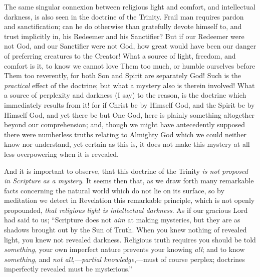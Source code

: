 The same singular connexion between religious light
and comfort, and intellectual darkness, is also seen in
the doctrine of the Trinity. Frail man requires pardon
and sanctification; can he do otherwise than gratefully
devote himself to, and trust implicitly in, his Redeemer
and his Sanctifier? But if our Redeemer were not God, and
our Sanctifier were not God, how great would have been
our danger of preferring creatures to the Creator! What a
source of light, freedom, and comfort is it, to know we
cannot love Them too much, or humble ourselves before
Them too reverently, for both Son and Spirit are
separately God! Such is the \emph{practical} effect of
the doctrine; but what a mystery also is therein
involved! What a source of perplexity and darkness (I
say) to the reason, is the doctrine which immediately
results from it! for if Christ be by Himself God, and the
Spirit be by Himself God, and yet there be but One God,
here is plainly something altogether beyond our
comprehension; and, though we might have antecedently
supposed there were numberless truths relating to
Almighty God which we could neither know nor understand,
yet certain as this is, it does not make this mystery at
all less overpowering when it is revealed.

And it is important to observe, that this doctrine of
the Trinity \emph{is not proposed in Scripture as a mystery}.
It seems then that, as we draw forth many remarkable
facts concerning the natural world which do not lie on
its surface, so by meditation we detect in Revelation
this remarkable principle, which is not openly
propounded, \emph{that religious light is intellectual
darkness}. As if our gracious Lord had said to us;
``Scripture does not \emph{aim} at making
mysteries, but they are as shadows brought out by the Sun
of Truth. When you knew nothing of revealed light, you
knew not revealed darkness. Religious truth requires you
should be told \emph{something}, your own imperfect
nature prevents your knowing \emph{all}; and to know \emph{something},
and \emph{not all},—\emph{partial knowledge},—must
of course perplex; doctrines imperfectly revealed must be
mysterious.''

